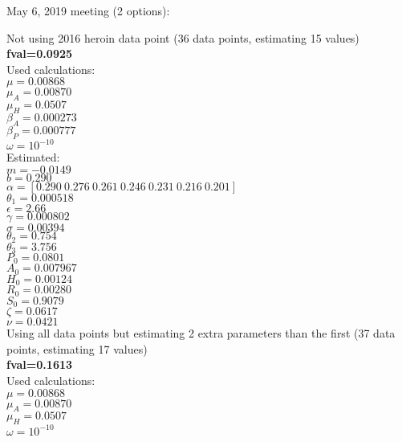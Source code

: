 \documentclass[12pt]{article}
\begin{document}
\pagebreak
May 6, 2019 meeting (2 options): 

\begin{multicols}{2}
Not using 2016 heroin data point (36 data points, estimating 15 values) \\
\textbf{fval=0.0925} \\
Used calculations: \\
$\mu=0.00868$ \\
$\mu_{A}=0.00870$ \\
$\mu_{H}=0.0507$ \\
$\beta_A=0.000273$ \\
$\beta_P=0.000777$ \\
$\omega=10^{-10}$ \\ 

Estimated: \\
$m=-0.0149$ \\
$b=0.290$\\
$\alpha=[0.290  \   0.276  \   0.261    \   0.246 \    0.231    \     0.216  \  0.201  ]$ \\
$\theta_1=0.000518 $\\
$\epsilon=2.66$ \\
$\gamma=0.000802$\\
$\sigma=0.00394$ \\
$\theta_2=0.754$  \\
$\theta_3=3.756$ \\
$P_0=0.0801$ \\
$A_0=0.007967$ \\
$H_0=0.00124$ \\
$R_0=0.00280$ \\
$S_0=0.9079$ \\
$\zeta=0.0617$ \\
$\nu=0.0421$ \\ 


\columnbreak
Using all data points but estimating 2 extra parameters than the first (37 data points, estimating 17 values) \\
\textbf{fval=0.1613} \\
Used calculations: \\
$\mu=0.00868$ \\
$\mu_{A}=0.00870$ \\
$\mu_{H}=0.0507$ \\
$\omega=10^{-10}$ \\ 
\vspace{0.6cm}


\end{multicols}
\end{document}
